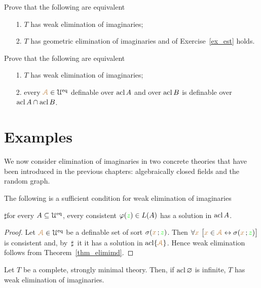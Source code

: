 \documentclass[creche.tex]{subfiles}
\begin{document}
  
  \begin{exercise}\label{ex_wei=est+gei}
    Prove that the following are equivalent
    \begin{itemize}
    \item[1.]  $T$ has weak elimination of imaginaries;
    \item[2.]  $T$ has geometric elimination of imaginaries and  of Exercise~\ref{ex_est} holds.\QED
    \end{itemize} 
  \end{exercise}
  
  \begin{example}
    Prove that the following are equivalent
    \begin{itemize}
    \item[1.] $T$ has weak elimination of imaginaries;
    \item[2.] every ${\color{brown}\EuScript A}\in \EuScript U^{{\rm eq}}$ definable over $\mathop{\rm acl} A$ and over $\mathop{\rm acl} B$ is definable over $\mathop{\rm acl} A\cap\mathop{\rm acl} B$.\QED
    \end{itemize} 
  \end{example}

\section{Examples}

We now consider elimination of imaginaries in two concrete theories that have been introduced in the previous chapters: 
algebraically closed fields and the random graph.

\begin{lemma}\label{tvtestimmaginari}
The following is a sufficient condition for weak elimination of imaginaries

$\sharp$\qquad for every $A\subseteq\EuScript U^{{\rm eq}}$, every consistent $\varphi({\color{green} z})\in L(A)$ has a solution in $\mathop{\rm acl} A$.
\end{lemma}

\begin{proof}
Let ${\color{brown}\EuScript A}\in\EuScript U^{{\rm eq}}$ be a definable set of sort $\sigma({\color{brown} x}\,;{\color{green} z})$.
Then $\forall{\color{brown}x}\ \big[{\color{brown} x}\in{\color{brown}\EuScript A}\leftrightarrow\sigma({\color{brown} x}\,;{\color{green} z})\big]$ is consistent and, by $\,\sharp\,$ it  it has a solution in $\mathop{\rm acl}\{{\color{brown}\EuScript A}\}$.
Hence weak elimination follows from Theorem~\ref{thm_elimimd}.
\end{proof}

\begin{theorem}\label{elimimsm} 
Let $T$ be a complete, strongly minimal theory.
Then, if $\mathop{\rm acl}\varnothing$ is infinite, $T$ has weak elimination of imaginaries.
\end{theorem}
\end{document}
